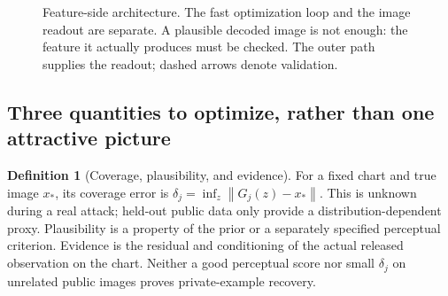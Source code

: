 \documentclass[11pt,a4paper]{article}
\theoremstyle{definition}
\theoremstyle{definition}
\newtheorem{definition}[theorem]{Definition}
\theoremstyle{remark}\newtheorem{remark}[theorem]{Remark}
\newcommand{\norm}[1]{\left\lVert #1\right\rVert}
\begin{document}
\begin{figure}[htbp]
\centering
{}
\caption{Feature-side architecture. The fast optimization loop and the image readout are separate. A plausible decoded image is not enough: the feature it actually produces must be checked. The outer path supplies the readout; dashed arrows denote validation.}
\label{fig:featurechart}
\end{figure}

\subsection{Three quantities to optimize, rather than one attractive picture}

\begin{definition}[Coverage, plausibility, and evidence]
For a fixed chart and true image $x_*$, its coverage error is
$\delta_j=\inf_z\norm{G_j(z)-x_*}$. This is unknown during a real attack; held-out public data only provide a distribution-dependent proxy. Plausibility is a property of the prior or a separately specified perceptual criterion. Evidence is the residual and conditioning of the actual released observation on the chart. Neither a good perceptual score nor small $\delta_j$ on unrelated public images proves private-example recovery.
\end{definition}
\end{document}
